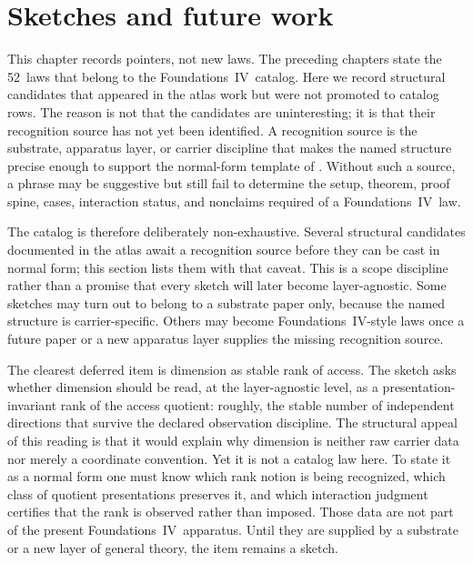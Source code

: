 \documentclass[11pt]{article}
\newcommand{\FIV}{Foundations~IV}
\newcommand{\NumLaws}{52}
\theoremstyle{definition}
\begin{document}
 \section{Sketches and future work}\label{sec:sketches}

This chapter records pointers, not new laws. The preceding chapters
state the \NumLaws\ laws that belong to the \FIV\ catalog. Here we
record structural candidates that appeared in the atlas work but were
not promoted to catalog rows. The reason is not that the candidates
are uninteresting; it is that their recognition source has not yet
been identified. A recognition source is the substrate, apparatus
layer, or carrier discipline that makes the named structure precise
enough to support the normal-form template of .
Without such a source, a phrase may be suggestive but still fail to
determine the setup, theorem, proof spine, cases, interaction status, and
nonclaims required of a \FIV\ law.

The catalog is therefore deliberately non-exhaustive. Several structural
candidates documented in the atlas await a recognition source before
they can be cast in normal form; this section lists them with that
caveat. This is a scope discipline rather than a promise that every
sketch will later become layer-agnostic. Some sketches may turn out to
belong to a substrate paper only, because the named structure is
carrier-specific. Others may become \FIV-style laws once a future paper
or a new apparatus layer supplies the missing recognition source.

The clearest deferred item is dimension as stable rank of access. The
sketch asks whether dimension should be read, at the layer-agnostic
level, as a presentation-invariant rank of the access quotient: roughly,
the stable number of independent directions that survive the declared
observation discipline. The structural appeal of this reading is that it
would explain why dimension is neither raw carrier data nor merely a
coordinate convention. Yet it is not a catalog law here. To state it as a
normal form one must know which rank notion is being recognized, which
class of quotient presentations preserves it, and which interaction
judgment certifies that the rank is observed rather than imposed. Those
data are not part of the present \FIV\ apparatus. Until they are supplied
by a substrate or a new layer of general theory, the item remains a
sketch.
\end{document}
